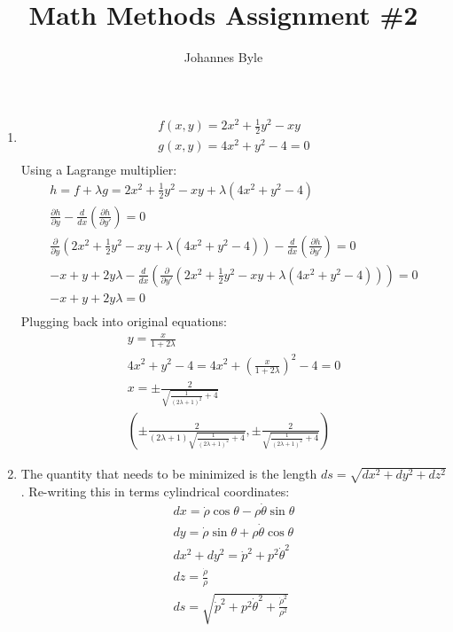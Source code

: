 \documentclass[12pt]{article}
\title{Math Methods Assignment \#2}
\author{Johannes Byle}
\begin{document}
  \maketitle
  \begin{enumerate}
    \item
    \begin{gather*}
      f(x,y)=2x^2+\frac{1}{2}y^2-xy\\
      g(x,y)=4x^2+y^2-4=0\\
    \end{gather*}
    Using a Lagrange multiplier:
    \begin{gather*}
      h=f+\lambda g=2x^2+\frac{1}{2}y^2-xy+\lambda\left(4x^2+y^2-4\right)\\
      \frac{\partial h}{\partial y}-\frac{d}{dx}\left(\frac{\partial h}{\partial y'}\right)=0\\
      \frac{\partial }{\partial y}\left(2x^2+\frac{1}{2}y^2-xy+\lambda\left(4x^2+y^2-4\right)\right)-\frac{d}{dx}\left(\frac{\partial h}{\partial y'}\right)=0\\
      -x+y+2y\lambda-\frac{d}{dx}\left(\frac{\partial}{\partial y'}\left(2x^2+\frac{1}{2}y^2-xy+\lambda\left(4x^2+y^2-4\right)\right)\right)=0\\
      -x+y+2y\lambda=0\\
    \end{gather*}
    Plugging back into original equations:
    \begin{gather*}
      y=\frac{x}{1+2\lambda}\\
      4x^2+y^2-4=4x^2+\left(\frac{x}{1+2\lambda}\right)^2-4=0\\
      x=\pm\frac{2}{\sqrt{\frac{1}{(2 \lambda +1)^2}+4}}\\
      \left(\pm\frac{2}{(2 \lambda +1) \sqrt{\frac{1}{(2 \lambda +1)^2}+4}},\pm\frac{2}{\sqrt{\frac{1}{(2 \lambda +1)^2}+4}}\right)
    \end{gather*}
    \item
    The quantity that needs to be minimized is the length $ds=\sqrt{dx^2+dy^2+dz^2}$.
    Re-writing this in terms cylindrical coordinates:
    \begin{gather*}
      dx=\dot{\rho}\cos\theta-\rho\dot{\theta}\sin\theta\\
      dy=\dot{\rho}\sin\theta+\rho\dot{\theta}\cos\theta\\
      dx^2+dy^2=\dot{p}^2+p^2 \dot{\theta}^2\\
      dz=\frac{\dot{\rho}}{\rho}\\
      ds=\sqrt{\dot{p}^2+p^2 \dot{\theta}^2+\frac{\dot{\rho}^2}{\rho^2}}

\end{gather*}
\end{enumerate}
\end{document}
